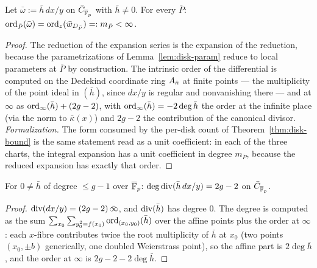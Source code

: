 \begin{lemma}
\label{lem:ord-match}
\leanok
{}
Let $\bar\omega := \bar h\,dx/y$ on $\bar C_{\overline{\mathbb{F}}_p}$ with $\bar h \ne 0$. For every
$\bar P$:
$\operatorname{ord}_{\bar P}(\bar\omega) = \operatorname{ord}_z(\bar w_{D_{\bar P}}) =: m_{\bar P} < \infty$.
\end{lemma}
\begin{proof}
\leanok
The reduction of the expansion series is the expansion of the reduction, because the
parametrizations of Lemma~\ref{lem:disk-param} reduce to local parameters at $\bar P$ by
construction. The intrinsic order of the differential is computed on the Dedekind
coordinate ring $A_{\bar\kappa}$ at finite points --- the multiplicity of the point
ideal in $(\bar h)$, since $dx/y$ is regular and nonvanishing there --- and at $\infty$
as $\operatorname{ord}_\infty(\bar h) + (2g-2)$, with $\operatorname{ord}_\infty(\bar h) = -2\deg\bar h$ the order
at the infinite place (via the norm to $\bar\kappa(x)$) and $2g-2$ the contribution of
the canonical divisor. \emph{Formalization.} The form consumed by the per-disk count of
Theorem~\ref{thm:disk-bound} is the same statement read as a unit coefficient: in each
of the three charts, the integral expansion has a unit coefficient in degree
$m_{\bar P}$, because the reduced expansion has exactly that order.
\end{proof}

\begin{lemma}
\label{lem:canon-deg}
\leanok
{}
For $0 \ne \bar h$ of degree $\le g-1$ over $\overline{\mathbb{F}}_p$:
$\deg \operatorname{div}(\bar h\,dx/y) = 2g-2$ on $\bar C_{\overline{\mathbb{F}}_p}$.
\end{lemma}
\begin{proof}
\leanok
$\operatorname{div}(dx/y) = (2g-2)\,\bar\infty$, and $\operatorname{div}(\bar h)$ has degree $0$. The degree
is computed as the sum $\sum_{x_0}\sum_{y_0^2 = f(x_0)} \operatorname{ord}_{(x_0,y_0)}(\bar h)$ over
the affine points plus the order at $\infty$: each $x$-fibre contributes twice the root
multiplicity of $\bar h$ at $x_0$ (two points $(x_0,\pm b)$ generically, one doubled
Weierstrass point), so the affine part is $2\deg\bar h$, and the order at $\infty$ is
$2g-2-2\deg\bar h$.
\end{proof}

